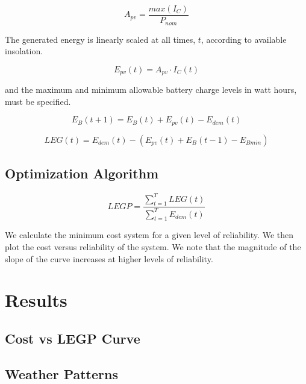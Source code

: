 \documentclass{article}
\begin{document}
\begin{equation}
A_{pv} = \frac{max(I_C)}{P_{nom}}
\end{equation}

The generated energy is linearly scaled at all times, $t$, according to available insolation. 

\begin{equation}
E_{pv}(t) = A_{pv} \cdot I_C(t)
\end{equation}


and the maximum and minimum allowable battery charge levels in watt hours, must be specified.


\begin{equation}
E_B (t+1) = E_B (t) + E_{pv} (t) - E_{dem} (t)
\end{equation}


\begin{equation}
LEG(t) = E_{dem} (t) - (E_{pv} (t)+E_B(t-1)-E_{Bmin})
\end{equation}


\subsection{Optimization Algorithm}



\begin{equation}
LEGP = \frac{\sum_{t=1}^T LEG(t)}{\sum_{t=1}^T E_{dem} (t)}
\end{equation}





We calculate the minimum cost system for a given level of reliability.
We then plot the cost versus reliability of the system.
We note that the magnitude of the slope of the curve increases at higher
levels of reliability.


\section{Results}
\subsection{Cost vs LEGP Curve}
\subsection{Weather Patterns}
\end{document}
